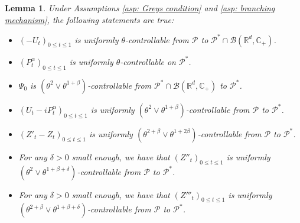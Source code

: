 \documentclass[12pt,a4paper]{amsart}
\theoremstyle{plain}
\newtheorem{lem}[thm]{Lemma}
\theoremstyle{definition}
\numberwithin{equation}{section}
\begin{document}
\begin{lem}
  \label{lem: upper bound for usgx}
  Under Assumptions \ref{asp: Greys condition} and \ref{asp: branching mechanism}, the following statements are true:
  \begin{itemize}
  \item[(1)]
    $(-U_t)_{0\leq t\leq 1}$ is uniformly $\theta$-controllable from $\mathcal P$ to $\mathcal P^*\cap \mathcal B(\mathbb R^d, \mathbb C_+)$.
  \item[(2)]
    $(P^\alpha_t)_{0\leq t\leq 1}$ is uniformly $\theta$-controllable on $\mathcal P^*$.
  \item[(3)]
    $\Psi_0$ is $(\theta^2\vee \theta^{1+\beta})$-controllable from $\mathcal P^* \cap \mathcal B(\mathbb R^d, \mathbb C_+)$ to $\mathcal P^*$.
  \item[(4)]
    $(U_t- iP_t^{\alpha})_{0\leq t\leq 1}$ is uniformly $(\theta^2\vee \theta^{1+\beta})$-controllable from $\mathcal P$ to $\mathcal P^*$.
  \item[(5)]
    $(Z'_t-Z_t)_{0\leq t\leq 1}$ is uniformly $(\theta^{2+\beta}\vee \theta^{1+2\beta})$-controllable from $\mathcal P$ to $\mathcal P^*$.
  \item[(6)]
    For any $\delta > 0$ small enough, we have that $(Z''_t)_{0\leq t\leq 1}$ is uniformly $(\theta^2\vee \theta^{1+\beta+\delta})$-controllable from $\mathcal P$ to $\mathcal P^*$.
  \item[(7)]
    For any $\delta > 0$ small enough, we have that $(Z'''_t)_{0\leq t\leq 1}$ is uniformly $(\theta^{2+\beta}\vee \theta^{1+\beta+\delta})$-controllable from $\mathcal P$ to $\mathcal P^*$.
  \end{itemize}
\end{lem}
\end{document}
